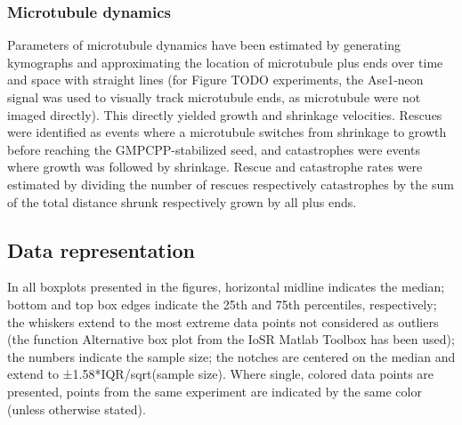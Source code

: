 \subsubsection{Microtubule dynamics}
Parameters of microtubule dynamics have been estimated by generating kymographs and approximating the location of microtubule plus ends over time and space with straight lines (for Figure TODO experiments, the Ase1-neon signal was used to visually track microtubule ends, as microtubule were not imaged directly). This directly yielded growth and shrinkage velocities. Rescues were identified as events where a microtubule switches from shrinkage to growth before reaching the GMPCPP-stabilized seed, and catastrophes were events where growth was followed by shrinkage. Rescue and catastrophe rates were estimated by dividing the number of rescues respectively catastrophes by the sum of the total distance shrunk respectively grown by all plus ends.

\subsection{Data representation}
In all boxplots presented in the figures, horizontal midline indicates the median; bottom and top box edges indicate the 25th and 75th percentiles, respectively; the whiskers extend to the most extreme data points not considered as outliers (the function Alternative box plot from the IoSR Matlab Toolbox has been used); the numbers indicate the sample size; the notches are centered on the median and extend to ±1.58*IQR/sqrt(sample size). Where single, colored data points are presented, points from the same experiment are indicated by the same color (unless otherwise stated). 